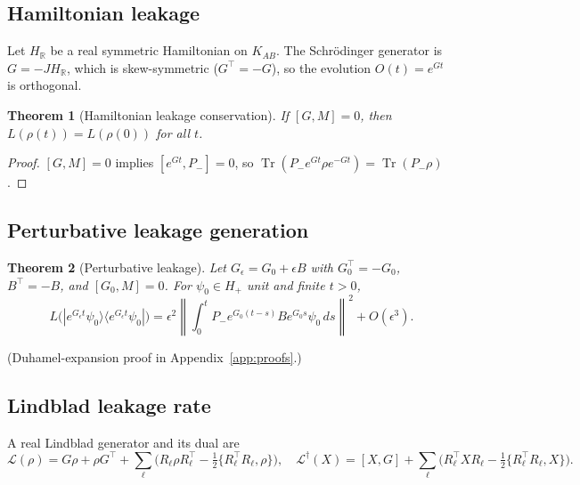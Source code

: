 \documentclass[a4paper,onecolumn,noarxiv]{quantumarticle}
\theoremstyle{plain}
\newtheorem{theorem}{Theorem}
\theoremstyle{definition}
\theoremstyle{remark}
\newcommand{\R}{\mathbb{R}}
\newcommand{\KAB}{K_{AB}}
\newcommand{\Pminus}{P_{-}}
\newcommand{\Hplus}{H_{+}}
\newcommand{\Mop}{M}
\newcommand{\Tr}{\operatorname{Tr}}
\newcommand{\Ldag}{\mathcal{L}^{\dagger}}
\newcommand{\Lleak}{L}
\begin{document}
\subsection{Hamiltonian leakage}

Let $H_\R$ be a real symmetric Hamiltonian on $\KAB$. The Schr\"{o}dinger generator
is $G=-JH_\R$, which is skew-symmetric ($G^\top=-G$), so the evolution $O(t)=e^{Gt}$
is orthogonal.

\begin{theorem}[Hamiltonian leakage conservation]
\label{thm:hamiltonian}
If $[G,\Mop]=0$, then $\Lleak(\rho(t))=\Lleak(\rho(0))$ for all $t$.
\end{theorem}

\begin{proof}
$[G,\Mop]=0$ implies $[e^{Gt},\Pminus]=0$, so
$\Tr(\Pminus e^{Gt}\rho e^{-Gt})=\Tr(\Pminus\rho)$.
\end{proof}

\subsection{Perturbative leakage generation}

\begin{theorem}[Perturbative leakage]
\label{thm:perturbative}
Let $G_\epsilon=G_0+\epsilon B$ with $G_0^\top=-G_0$, $B^\top=-B$, and
$[G_0,\Mop]=0$. For $\psi_0\in\Hplus$ unit and finite $t>0$,
\begin{equation}
  \Lleak\bigl(|e^{G_\epsilon t}\psi_0\rangle\langle e^{G_\epsilon t}\psi_0|\bigr)
  = \epsilon^2\left\|\int_0^t\Pminus e^{G_0(t-s)}Be^{G_0 s}\psi_0\,ds\right\|^2
  + O(\epsilon^3).
\end{equation}
\end{theorem}

(Duhamel-expansion proof in Appendix~\ref{app:proofs}.)

\subsection{Lindblad leakage rate}

A real Lindblad generator and its dual are
\begin{equation}
  \mathcal{L}(\rho) = G\rho+\rho G^\top
  +\sum_\ell\bigl(R_\ell\rho R_\ell^\top-\tfrac{1}{2}\{R_\ell^\top R_\ell,\rho\}\bigr),
  \quad
  \Ldag(X) = [X,G]+\sum_\ell\bigl(R_\ell^\top XR_\ell
  -\tfrac{1}{2}\{R_\ell^\top R_\ell,X\}\bigr).
  \label{eq:lindblad}
\end{equation}
\end{document}
